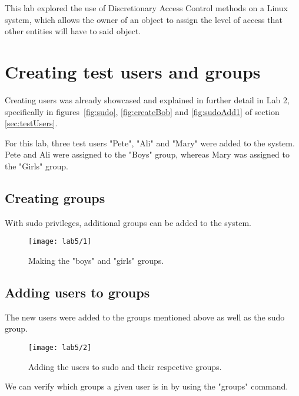 This lab explored the use of Discretionary Access Control methods on a Linux system, which allows
the owner of an object to assign the level of access that other entities will have to said object.

\section{Creating test users and groups}\label{sec:creating-test-users}

\begin{tcolorbox}[colback=orange!5!white,colframe=orange!75!black,title=Note]
    Creating users was already showcased and explained in
    further detail in Lab 2, specifically in figures~\ref{fig:sudo}, \ref{fig:createBob}
    and \ref{fig:sudoAdd1} of section \ref{sec:testUsers}.
\end{tcolorbox}

\noindent For this lab, three test users "Pete", "Ali" and "Mary" were added to the system.
Pete and Ali were assigned to the "Boys" group, whereas Mary was assigned to the "Girls" group.

\subsection{Creating groups}\label{subsec:creating-groups}
With sudo privileges, additional groups can be added to the system.

\begin{figure}[H]
    \centering
    \texttt{[image: lab5/1]}
    \caption{Making the "boys" and "girls" groups.}
    \label{fig:addgroup}
\end{figure}

\subsection{Adding users to groups}\label{subsec:adding-users-to-groups}

The new users were added to the groups mentioned above as well as the sudo group.

\begin{figure}[H]
    \centering
    \texttt{[image: lab5/2]}
    \caption{Adding the users to sudo and their respective groups.}
    \label{fig:addToGroup}
\end{figure}

We can verify which groups a given user is in by using the "groups" command.

